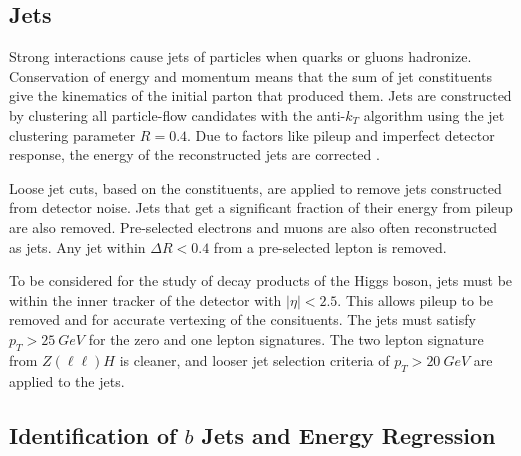 \subsection{Jets} \label{sec:jets-def}

Strong interactions cause jets of particles when quarks or gluons hadronize.
Conservation of energy and momentum means that the sum of jet constituents
give the kinematics of the initial parton that produced them.
Jets are constructed by clustering all particle-flow candidates
with the anti-$k_T$ algorithm \cite{Cacciari_2008}
using the jet clustering parameter $R = 0.4$.
Due to factors like pileup and imperfect detector response,
the energy of the reconstructed jets are corrected \cite{Khachatryan_2017}.

Loose jet cuts, based on the constituents,
are applied to remove jets constructed from detector noise.
Jets that get a significant fraction of their energy from pileup are also removed.
Pre-selected electrons and muons are also often reconstructed as jets.
Any jet within $\Delta R < 0.4$ from a pre-selected lepton is removed.

To be considered for the study of decay products of the Higgs boson,
jets must be within the inner tracker of the detector with $|\eta| < 2.5$.
This allows pileup to be removed and for accurate vertexing of the consituents.
The jets must satisfy $p_T > \SI{25}{GeV}$ for the zero and one lepton signatures.
The two lepton signature from $Z(\ell\ell)H$ is cleaner,
and looser jet selection criteria of $p_T > \SI{20}{GeV}$ are applied to the jets.

\subsection{Identification of $b$ Jets and Energy Regression}

